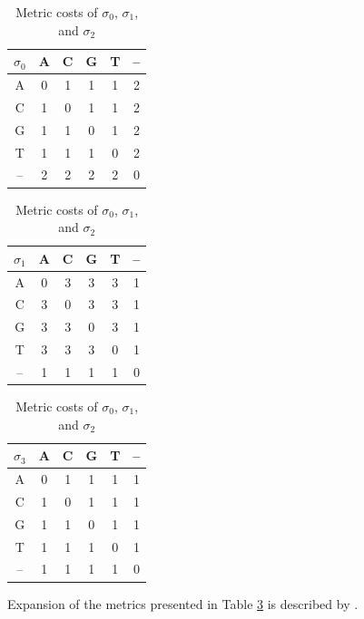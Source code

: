 \documentclass{bmcart}
\begin{document}
\begin{backmatter}
    \begin{table}[!hbt]
    	\caption{Metric costs of $\sigma_0$, $\sigma_1$, and $\sigma_2$}
    	\label{Tab:Metrics}
    	\begin{minipage}{0.33\textwidth}
    		\centering
    		\begin{tabular}{c|ccccc}
    			$\sigma_0$ & A & C & G & T & -- \\ \hline
    			A  & 0 & 1 & 1 & 1 & 2  \\
    			C  & 1 & 0 & 1 & 1 & 2  \\
    			G  & 1 & 1 & 0 & 1 & 2  \\
    			T  & 1 & 1 & 1 & 0 & 2  \\
    			-- & 2 & 2 & 2 & 2 & 0
    		\end{tabular}
    	\end{minipage}
    	\hfill
    	\begin{minipage}{0.3\textwidth}
    		\centering
    		\begin{tabular}{c|ccccc}
    			$\sigma_1$ & A & C & G & T & -- \\ \hline
    			A  & 0 & 3 & 3 & 3 & 1  \\
    			C  & 3 & 0 & 3 & 3 & 1  \\
    			G  & 3 & 3 & 0 & 3 & 1  \\
    			T  & 3 & 3 & 3 & 0 & 1  \\
    			-- & 1 & 1 & 1 & 1 & 0
    		\end{tabular}
    	\end{minipage}
        \hfill
        \begin{minipage}{0.3\textwidth}
    	\centering
    	\begin{tabular}{c|ccccc}
    		$\sigma_3$ & A & C & G & T & -- \\ \hline
    		A  & 0 & 1 & 1 & 1 & 1  \\
    		C  & 1 & 0 & 1 & 1 & 1  \\
    		G  & 1 & 1 & 0 & 1 & 1  \\
    		T  & 1 & 1 & 1 & 0 & 1  \\
    		-- & 1 & 1 & 1 & 1 & 0
    	\end{tabular}
        \end{minipage}\par
        \vspace{0.75em}\raggedright
        Expansion of the metrics presented in Table \ref{Tab:Metrics} is described by \cite{VaronandWheeler2012}.
    \end{table}
    

\end{backmatter}
\end{document}
